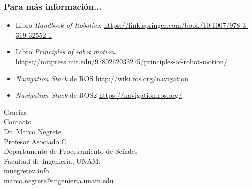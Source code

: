 \documentclass[10pt,spanish,aspectratio=1610]{beamer}
\begin{document}
\begin{frame}\frametitle{Para más información...}
  \begin{itemize}
  \item Libro \textit{Handbook of Robotics}. \url{https://link.springer.com/book/10.1007/978-3-319-32552-1}
  \item Libro \textit{Principles of robot motion}. \url{https://mitpress.mit.edu/9780262033275/principles-of-robot-motion/}
  \item \textit{Navigation Stack} de ROS \url{http://wiki.ros.org/navigation}
  \item \textit{Navigation Stack} de ROS2 \url{https://navigation.ros.org/}
  \end{itemize}
\end{frame}



\begin{frame}
  \Huge{Gracias}
  \[\]
  \Large{Contacto}
  \[\]
  \large
  Dr. Marco Negrete\\
  Profesor Asociado C\\
  Departamento de Procesamiento de Señales\\
  Facultad de Ingeniería, UNAM.
\[\]
mnegretev.info\\
marco.negrete@ingenieria.unam.edu\\
\end{frame}
\end{document}
